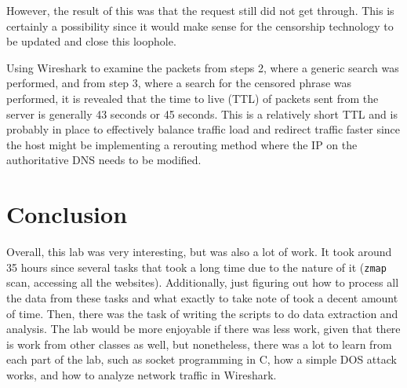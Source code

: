 \documentclass[11pt]{article}
\begin{document}
However, the result of this was that the request still did not get through. This is certainly a possibility
since it would make sense for the censorship technology to be updated and close this loophole.

Using Wireshark to examine the packets from steps 2, where a generic search was performed, and from
step 3, where a search for the censored phrase was performed, it is revealed that the time to live (TTL)
of packets sent from the server is generally 43 seconds or 45 seconds. This is a relatively short TTL
and is probably in place to effectively balance traffic load and redirect traffic faster since the host
might be implementing a rerouting method where the IP on the authoritative DNS needs to be modified.
\section*{Conclusion}
Overall, this lab was very interesting, but was also a lot of work. It took around 35 hours since several
tasks that took a long time due to the nature of it (\verb|zmap| scan, accessing all the websites). 
Additionally, just figuring out how to process all the data from these tasks and what exactly to take note
of took a decent amount of time. Then, there was the task of writing the scripts to do data extraction
and analysis. The lab would be more enjoyable if there was less work, given that there is work from
other classes as well, but nonetheless, there was a lot to learn from each part of the lab, such as socket
programming in C, how a simple DOS attack works, and how to analyze network traffic in Wireshark.



\end{document}
